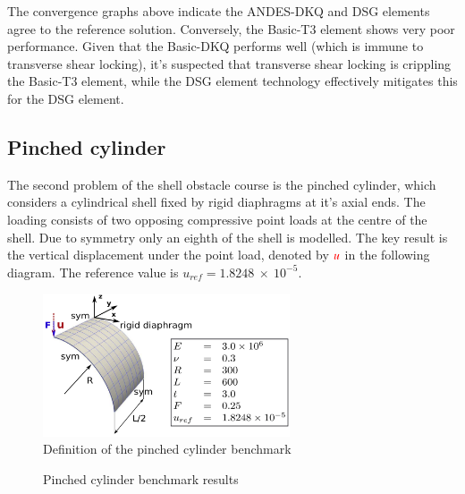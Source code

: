 The convergence graphs above indicate the ANDES-DKQ and DSG elements agree to the reference solution. Conversely, the Basic-T3 element shows very poor performance. Given that the Basic-DKQ performs well (which is immune to transverse shear locking), it's suspected that transverse shear locking is crippling the Basic-T3 element, while the DSG element technology effectively mitigates this for the DSG element. 
\newpage
\subsection{Pinched cylinder}
%

The second problem of the shell obstacle course is the pinched cylinder, which considers a cylindrical shell fixed by rigid diaphragms at it's axial ends. The loading consists of two opposing compressive point loads at the centre of the shell. Due to symmetry only an eighth of the shell is modelled. The key result is the vertical displacement under the point load, denoted by $\textcolor{red}{u}$ in the following diagram. The reference value is $u_{ref} =  1.8248\ \times\ 10^{-5}$. 
 
 \begin{figure}[H]
 	\centering
 	\def\svgwidth{\columnwidth}
 	\includegraphics[width=7.3cm]{images/pinchedcylinder.png}
 	\caption{Definition of the pinched cylinder benchmark\cite{Bou13}}
 \end{figure}
 
\begin{figure}[H]
	\caption{\label{ref_label_overall}Pinched cylinder benchmark results}
\end{figure}

